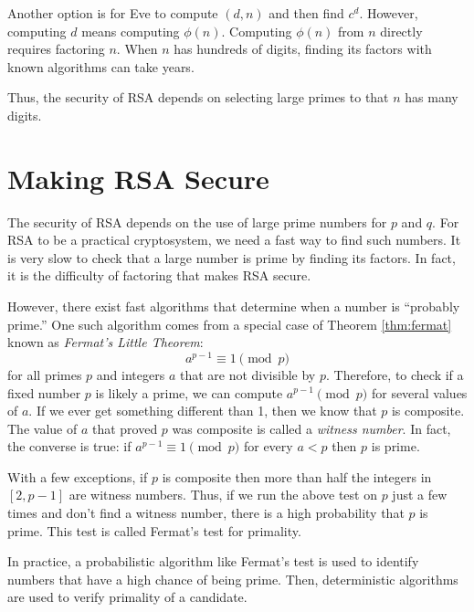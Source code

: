 Another option is for Eve to compute $(d, n)$ and then find $c^d$.
However, computing $d$ means computing $\phi(n)$.
Computing $\phi(n)$ from $n$ directly requires factoring $n$.
When $n$ has hundreds of digits, finding its factors with known algorithms can take years.

Thus, the security of RSA depends on selecting large primes to that $n$ has many digits.

\section*{Making RSA Secure}

The security of RSA depends on the use of large prime numbers for $p$ and $q$.
For RSA to be a practical cryptosystem, we need a fast way to find such numbers.
It is very slow to check that a large number is prime by finding its factors.
In fact, it is the difficulty of factoring that makes RSA secure.

However, there exist fast algorithms that determine when a number is ``probably prime.''
One such algorithm comes from a special case of Theorem \ref{thm:fermat} known as \emph{Fermat's Little Theorem}:
\[
a^{p-1} \equiv 1 \pmod{p}
\]
for all primes $p$ and integers $a$ that are not divisible by $p$.
Therefore, to check if a fixed number $p$ is likely a prime, we can compute $a^{p-1} \pmod{p}$ for several values of $a$.
If we ever get something different than 1, then we know that $p$ is composite.
The value of $a$ that proved $p$ was composite is called a \emph{witness number}.
In fact, the converse is true: if $a^{p-1} \equiv 1 \pmod{p}$ for every $a<p$ then $p$ is prime.

With a few exceptions, if $p$ is composite then more than half the integers in $[2, p-1]$ are witness numbers.
Thus, if we run the above test on $p$ just a few times and don't find a witness number, there is a high probability that $p$ is prime.
This test is called Fermat's test for primality.

In practice, a probabilistic algorithm like Fermat's test is used to identify numbers that have a high chance of being prime. 
Then, deterministic algorithms are used to verify primality of a candidate.

